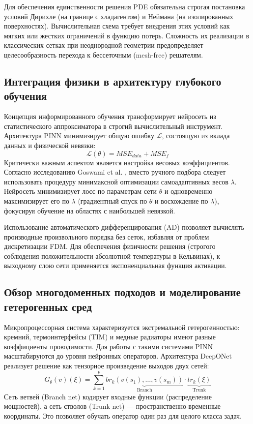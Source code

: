 \documentclass[conference]{IEEEtran}
\begin{document}
    Для обеспечения единственности решения PDE обязательна строгая постановка условий Дирихле (на границе с хладагентом) и Неймана (на изолированных поверхностях). Вычислительная схема требует внедрения этих условий как мягких или жестких ограничений в функцию потерь. Сложность их реализации в классических сетках при неоднородной геометрии предопределяет целесообразность перехода к бессеточным (mesh-free) решателям.
    
    \subsection{Интеграция физики в архитектуру глубокого обучения}
    Концепция информированного обучения трансформирует нейросеть из статистического аппроксиматора в строгий вычислительный инструмент. Архитектура PINN минимизирует общую ошибку $\mathcal{L}$, состоящую из вклада данных и физической невязки:
    \begin{equation}
        \mathcal{L}(\theta) = MSE_{data} + MSE_{f}
    \end{equation}
    Критически важным аспектом является настройка весовых коэффициентов. Согласно исследованию Goswami et al. \cite{goswami2022}, вместо ручного подбора следует использовать процедуру минимаксной оптимизации самоадаптивных весов $\lambda$. Нейросеть минимизирует лосс по параметрам сети $\theta$ и одновременно максимизирует его по $\lambda$ (градиентный спуск по $\theta$ и восхождение по $\lambda$), фокусируя обучение на областях с наибольшей невязкой.
    
    Использование автоматического дифференцирования (AD) позволяет вычислять производные произвольного порядка без сеток, избавляя от проблем дискретизации FDM. Для обеспечения физичности решения (строгого соблюдения положительности абсолютной температуры в Кельвинах), к выходному слою сети применяется экспоненциальная функция активации.
    
    \subsection{Обзор многодоменных подходов и моделирование гетерогенных сред}
    Микропроцессорная система характеризуется экстремальной гетерогенностью: кремний, термоинтерфейсы (TIM) и медные радиаторы имеют разные коэффициенты проводимости. Для работы с такими системами PINN масштабируются до уровня нейронных операторов. Архитектура DeepONet \cite{goswami2022} реализует решение как тензорное произведение выходов двух сетей:
    \begin{equation}
        G_{\theta}(v)(\xi) = \sum_{k=1}^p \underbrace{br_k(v(s_1), \dots, v(s_m))}_{\text{Branch}} \cdot \underbrace{tr_k(\xi)}_{\text{Trunk}}
    \end{equation}
    Сеть ветвей (Branch net) кодирует входные функции (распределение мощностей), а сеть стволов (Trunk net) — пространственно-временные координаты. Это позволяет обучать оператор один раз для целого класса задач.
    
\end{document}
